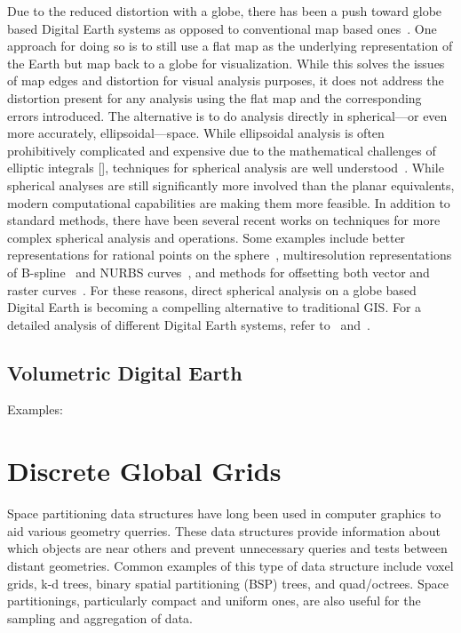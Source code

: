 Due to the reduced distortion with a globe, there has been a push toward globe based Digital Earth systems as opposed to conventional map based ones~\cite{goodchild2018reimagining}.
One approach for doing so is to still use a flat map as the underlying representation of the Earth but map back to a globe for visualization.
While this solves the issues of map edges and distortion for visual analysis purposes, it does not address the distortion present for any analysis using the flat map and the corresponding errors introduced.
The alternative is to do analysis directly in spherical---or even more accurately, ellipsoidal---space.
While ellipsoidal analysis is often prohibitively complicated and expensive due to the mathematical challenges of elliptic integrals [], techniques for spherical analysis are well understood~\cite{raskin1994spatial}.
While spherical analyses are still significantly more involved than the planar equivalents, modern computational capabilities are making them more feasible. 
In addition to standard methods, there have been several recent works on techniques for more complex spherical analysis and operations.
Some examples include better representations for rational points on the sphere~\cite{bahrdt2017rational}, multiresolution representations of B-spline~\cite{alderson2016multiresolution} and NURBS curves~\cite{alderson2019multiscale}, and methods for offsetting both vector and raster curves~\cite{alderson2018offsetting}.
For these reasons, direct spherical analysis on a globe based Digital Earth is becoming a compelling alternative to traditional GIS. For a detailed analysis of different Digital Earth systems, refer to~\cite{mahdavi2015survey} and~\cite{alderson2020digital}.


\subsection{Volumetric Digital Earth} \label{chap:2:VDE}
Examples: 


\section{Discrete Global Grids} \label{chap:2:DGG}
Space partitioning data structures have long been used in computer graphics to aid various geometry querries.
These data structures provide information about which objects are near others and prevent unnecessary queries and tests between distant geometries.
Common examples of this type of data structure include voxel grids, k-d trees, binary spatial partitioning (BSP) trees, and quad/octrees.
Space partitionings, particularly compact and uniform ones, are also useful for the sampling and aggregation of data. 


